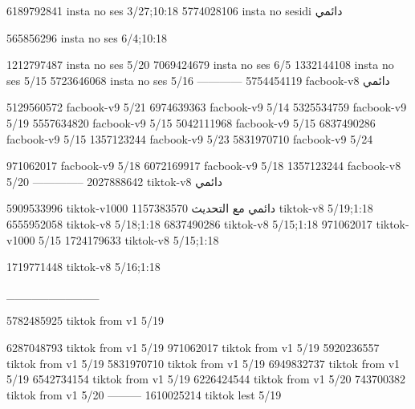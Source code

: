 
6189792841 insta no ses
3/27;10:18
5774028106 insta no sesidi
دائمي


565856296 insta no ses
6/4;10:18


1212797487 insta no ses
5/20
7069424679 insta no ses
6/5
1332144108 insta no ses
5/15
5723646068 insta no ses
5/16
------------
5754454119 facbook-v8
دائمي

5129560572 facbook-v9
5/21
6974639363 facbook-v9
5/14
5325534759 facbook-v9
5/19
5557634820 facbook-v9
5/15
5042111968 facbook-v9
5/15
6837490286 facbook-v9
5/15
1357123244 facbook-v9
5/23
5831970710 facbook-v9
5/24

971062017 facbook-v9
5/18
6072169917 facbook-v9
5/18
1357123244 facbook-v8
5/20
--------------
2027888642 tiktok-v8
دائمي

5909533996 tiktok-v1000
دائمي مع التحديث
1157383570 tiktok-v8
5/19;1:18
6555952058 tiktok-v8
5/18;1:18
6837490286 tiktok-v8
5/15;1:18
971062017 tiktok-v1000
5/15
1724179633 tiktok-v8
5/15;1:18

1719771448 tiktok-v8
5/16;1:18


___________

5782485925 tiktok from v1
5/19

6287048793 tiktok from v1
5/19
971062017 tiktok from v1
5/19
5920236557 tiktok from v1
5/19
5831970710 tiktok from v1
5/19
6949832737 tiktok from v1
5/19
6542734154 tiktok from v1
5/19
6226424544 tiktok from v1
5/20
743700382 tiktok from v1
5/20
---------
1610025214 tiktok lest
5/19
